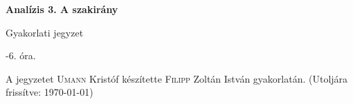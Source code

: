 \documentclass[a4paper,11.5pt]{article}
\begin{document}
	\setlength\parindent{0pt}
	\def\a{\textbf{a}}
	\def\b{\textbf{b}}
	\def\N{\hskip 10 true mm}
	\def\a{\textbf{a}}
	\def\b{\textbf{b}}
	\def\c{\textbf{c}}
	\def\d{\textbf{d}}
	\def\e{\textbf{e}}
	\def\gg{$\gamma$}
	\def\vi{\textbf{i}}
	\def\jj{\textbf{j}}
	\def\kk{\textbf{k}}
	\def\fh{\overrightarrow}
	\def\l{\lambda}
	\def\m{\mu}
	\def\v{\textbf{v}}
	\def\0{\textbf{0}}
	\def\s{\hspace{0.2mm}\vphantom{\beta}}
	\def\Z{\mathbb{Z}}
	\def\Q{\mathbb{Q}}
	\def\R{\mathbb{R}}
	\def\C{\mathbb{C}}
	\def\N{\mathbb{N}}
	\def\Rn{\mathbb{R}^{n}}
	\def\Ra{\overline{\mathbb{R}}}
	\def\sume{\displaystyle\sum_{n=1}^{+\infty}}
	\def\sumn{\displaystyle\sum_{n=0}^{+\infty}}
	\def\biz{\emph{Bizonyítás:\ }}
	\def\narrow{\underset{n\rightarrow+\infty}{\longrightarrow}}
	\def\limn{\displaystyle\lim_{n\to +\infty}}
	
	\theoremstyle{definition}
	\newtheorem{theorem}{Tétel}[subsubsection] %
	
	\theoremstyle{definition}
	\newtheorem{definition}[theorem]{Definíció} %
	\newtheorem{example}[theorem]{Példa} %
	\newtheorem{exercise}[theorem]{Házi feladat} %
	\newtheorem{note}[theorem]{Megjegyzés} %
	\newtheorem{task}[theorem]{Feladat} %
	\newtheorem{revision}[theorem]{Emlékeztető} %
	\begin{center}
		{\LARGE\textbf{Analízis 3. A szakirány}}
		\smallskip

		{\Large Gyakorlati jegyzet}

		-6. óra.
	\end{center}
	A jegyzetet \textsc{Umann} Kristóf készítette \textsc{Filipp} Zoltán István gyakorlatán. (Utoljára frissítve: \today)	\tableofcontents
\end{document}
